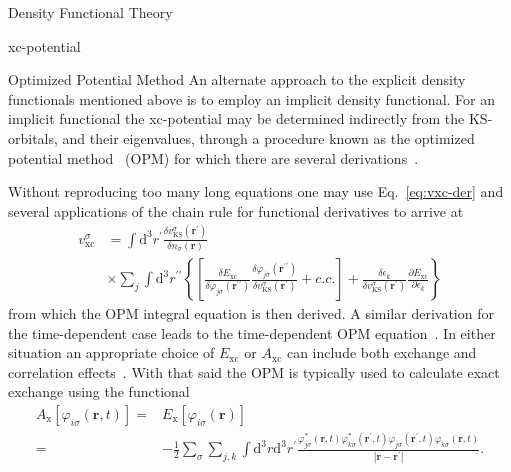\documentclass[letterpaper, 11 pt]{report}
\begin{document}
\begin{chapter}{Density Functional Theory \label{chap:dft}}
\begin{section}{xc-potential \label{sec:xcpot}}
\begin{subsection}{Optimized Potential Method \label{sec:opm}}
         An alternate approach to the explicit density functionals mentioned above is to employ an
         implicit density functional. For an implicit functional the xc-potential may be determined
         indirectly from the KS-orbitals, and their eigenvalues, through a procedure known as the
         optimized potential method~\cite{opm1, opm2} (OPM) for which there are several
         derivations~\cite{opm1, opm2, opm3, opm4, opm5, opm-rev}.

         Without reproducing too many long equations one may use Eq.~\eqref{eq:vxc-der} and several
         applications of the chain rule for functional derivatives to arrive at
         \begin{equation} \label{eq:opm1}
            \begin{split}
               v^\sigma_\mathrm{xc} & = \int \mathrm{d}^3 r^\prime
                  \frac{\delta v^\sigma_\mathrm{KS}(\mathbf{r^\prime})}{\delta n_\sigma(\mathbf{r}) } \\
                                    & \times \sum\limits_{j} \int \mathrm{d}^3 r^{\prime\prime}
               \left\{ \left[ 
               \frac{\delta E_\mathrm{xc}}{\delta \varphi_{j\sigma}(\mathbf{r^{\prime\prime}}) }
               \frac{\delta \varphi_{j\sigma}(\mathbf{r^{\prime\prime}}) }
                    {\delta v^\sigma_\mathrm{KS}(\mathbf{r^{\prime}}) }
               + c.c.
            \right]
            + \frac{\delta \epsilon_k}{\delta v^\sigma_\mathrm{KS}(\mathbf{r^{\prime}})}
              \frac{\partial E_\mathrm{xc}}{\partial \epsilon_k}
            \right\}
            \end{split}
         \end{equation}
         from which the OPM integral equation is then derived. A similar derivation for the
         time-dependent case leads to the time-dependent OPM equation~\cite{tdopm}. In either situation
         an appropriate choice of $E_\mathrm{xc}$ or $A_\mathrm{xc}$ can include both exchange and
         correlation effects~\cite{opm5, tdopm}. With that said the OPM is typically used to calculate
         exact exchange using the functional
         \begin{equation} \label{eq:xfunc}
            \begin{split}
               A_\mathrm{x}[\varphi_{i\sigma}(\mathbf{r},t)]
                 = & E_\mathrm{x}[\varphi_{i\sigma}(\mathbf{r})] \\
                = & -\frac{1}{2} \sum\limits_\sigma \sum\limits_{j,k}
                    \int\mathrm{d}^3 r \mathrm{d}^3 r^\prime
                    \frac{ \varphi^*_{j\sigma}(\mathbf{r},t) \varphi^*_{k\sigma}(\mathbf{r}^\prime,t)
                   \varphi_{j\sigma}(\mathbf{r}^\prime,t) \varphi_{k\sigma}(\mathbf{r},t)}
                   {\left| \mathbf{r} -\mathbf{r}^\prime \right|}.
            \end{split}
         \end{equation}


\end{subsection}
\end{section}
\end{chapter}
\end{document}

